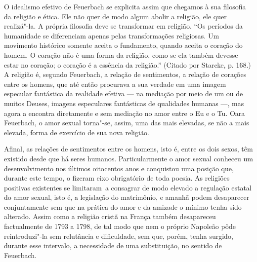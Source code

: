 \noindent{}O idealismo efetivo
de Feuerbach se
explicita assim que chegamos à sua filosofia da religião e ética. Ele
não quer de modo algum abolir a religião, ele quer realizá"-la. A própria
filosofia deve se transformar em religião. ``Os 
períodos da humanidade se diferenciam apenas pelas transformações
religiosas. Um movimento histórico somente aceita o fundamento, quando
aceita o coração do homem. O coração não é uma forma da religião, como
se ela também devesse estar no coração; o coração é a essência da
religião.'' (Citado por Starcke, p. 168.) A religião é,
segundo Feuerbach,
a relação de sentimentos, a relação de corações entre os homens, que até
então procurava a sua verdade em uma imagem especular fantástica da
realidade efetiva --- na mediação por meio de um ou de muitos Deuses,
imagens especulares fantásticas de qualidades humanas ---, mas agora a
encontra diretamente e sem mediação no amor entre o Eu e o Tu.
Oara Feuerbach,
o amor sexual torna"-se, assim, uma das mais elevadas, se não a mais
elevada, forma de exercício de sua nova religião.

Afinal, as relações de sentimentos entre os homens, isto é, entre os
dois sexos, têm existido desde que há seres humanos. Particularmente o
amor sexual conheceu um desenvolvimento nos últimos oitocentos anos e
conquistou uma posição que, durante este tempo, o fizeram eixo
obrigatório de toda poesia. As religiões positivas existentes se
limitaram\est\ a consagrar de modo elevado a regulação estatal do amor
sexual, isto é, a legislação do matrimônio, e amanhã podem desaparecer
conjuntamente sem que na prática do amor e da amizade o mínimo tenha
sido alterado. Assim como a religião cristã na França também desapareceu
factualmente de 1793 a 1798, de tal modo que nem o próprio Napoleão pôde
reintroduzi"-la sem relutância e dificuldade, sem que, porém, tenha
surgido, durante esse intervalo, a necessidade de uma substituição, no
sentido
de Feuerbach.

